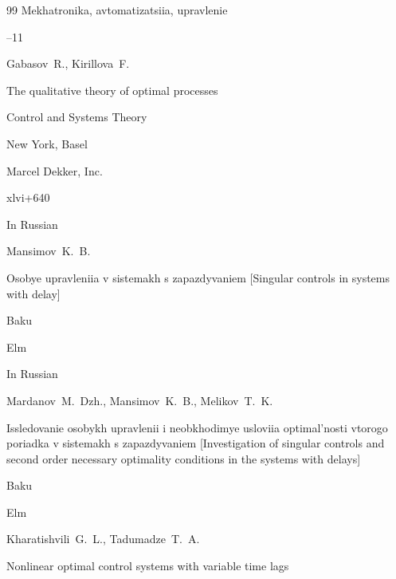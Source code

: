 \begin{thebibliography}{99}
\jour Mekhatronika, avtomatizatsiia, upravlenie



–11






\by Gabasov~R., Kirillova~F.

\book The qualitative theory of optimal processes


\serial Control and Systems Theory


\publaddr New York,  Basel

\publ Marcel Dekker, Inc.

\totalpages xlvi+640 





\lang In Russian

\by  Mansimov~K.~B.

\book Osobye upravleniia v sistemakh s zapazdyvaniem \rm [Singular controls in systems with delay]

\publaddr Baku

\publ Elm






\lang In Russian

\by Mardanov~M.~Dzh., Mansimov~K.~B., Melikov~T.~K.

\book Issledovanie osobykh upravlenii i neobkhodimye usloviia optimal'nosti vtorogo poriadka v sistemakh s zapazdyvaniem \rm [Investigation of singular controls and second order necessary optimality conditions in the systems with delays]

\publaddr Baku

\publ Elm








\by Kharatishvili~G.~L., Tadumadze~T.~A.

\paper Nonlinear optimal control systems with variable time lags


\end{thebibliography}
